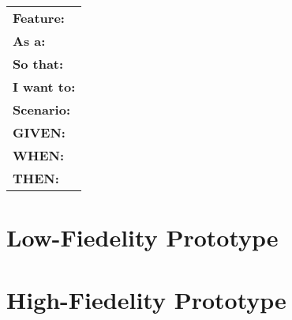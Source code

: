 \documentclass{article}
\begin{document}
\begin{table}[]
\begin{tabular}{|l|}
\hline
\textbf{Feature:} \\
\textbf{As a:} \\
\textbf{So that:} \\
\textbf{I want to:} \\
\textbf{Scenario:} \\
\textbf{GIVEN:} \\
\textbf{WHEN:} \\
\textbf{THEN:} \\
\hline
\end{tabular}
\end{table}

\section{Low-Fiedelity Prototype}

\section{High-Fiedelity Prototype}
\end{document}
